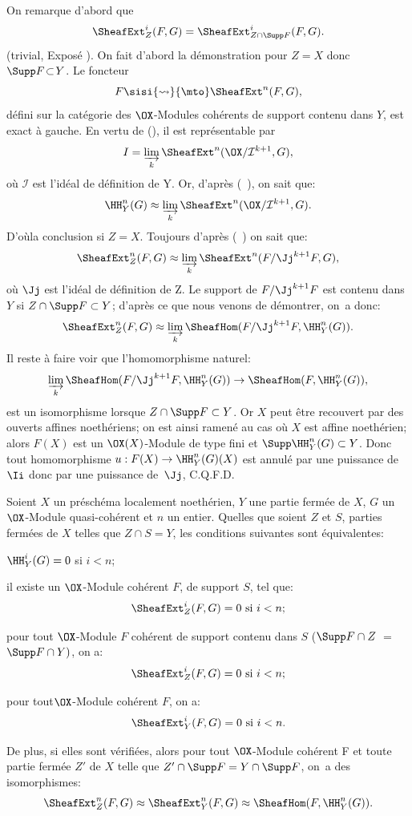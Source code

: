 On remarque d'abord que
\[
\SheafExt^i_Z(F, G) = \SheafExt^i_{Z \cap \Supp F}(F, G).
\]
(trivial, \cf Expos\'e ). On fait d'abord la d\'emonstration pour $Z \!=\! X$ donc \hbox{$\Supp F \!\subset\! Y$}. Le foncteur
\[F \sisi{\rightsquigarrow}{\mto} \SheafExt^n(F, G),
\]
d\'efini sur la cat\'egorie des $\OX$-Modules coh\'erents de support contenu dans $Y$, est exact \`a gauche. En vertu de (), il est repr\'esentable par
\[I = \varinjlim_{k} \SheafExt^n (\OX/\mathcal{I}^{k+1}, G),
\]
o\`u $\mathcal{I}$ est l'id\'eal de d\'efinition de Y. Or, d'apr\`es (~), on sait que:
\[
\HH^n_Y(G) \approx \varinjlim_{k} \SheafExt^n (\OX/\mathcal{I}^{k+1}, G).
\]
D'o\`u\pageoriginale la conclusion si $ Z= X$. Toujours d'apr\`es (~) on sait que:
\[
\SheafExt^n_Z (F, G) \approx \varinjlim_{k} \SheafExt^n (F/\Jj^{k + 1}F, G),
\]
o\`u $\Jj$ est l'id\'eal de d\'efinition de Z. Le support de $F/\Jj^{k+1}F$ est contenu dans $Y$ si $Z \cap \Supp F \subset Y$; d'apr\`es ce que nous venons de d\'emontrer, on~a donc:
\[
\SheafExt^n_Z (F, G) \approx \varinjlim_{k} \SheafHom (F/\Jj^{k + 1}F, \HH^n_Y(G)).
\]
Il reste \`a faire voir que l'homomorphisme naturel:
\[
\varinjlim_{k} \SheafHom (F/\Jj^{k + 1}F, \HH^n_Y(G)) \to \SheafHom (F, \HH^n_Y (G)),
\]
est un isomorphisme lorsque $Z \cap \Supp F \subset Y$. Or $X$ peut \^etre recouvert par des ouverts affines noeth\'eriens; on est ainsi ramen\'e au cas o\`u $X$ est affine noeth\'erien; alors $F(X)$ est un $\OX(X)$-Module de type fini et $\Supp \HH^n_Y(G) \subset Y$. Donc tout homomorphisme \hbox{$u: F(X) \to \HH^n_Y (G) (X)$} est annul\'e par une puissance de $\Ii$ donc par une puissance de~$\Jj$, \sisi{}{\hfill}C.Q.F.D.

\begin{proposition} \label{VII.1.2}
Soient $X$ un pr\'esch\'ema localement noeth\'erien, $Y$ une partie ferm\'ee de $X$, $G$ un $\OX$-Module quasi-coh\'erent et $n$ un entier. Quelles que soient $Z$ et $S$, parties ferm\'ees de $X$ telles que $Z \cap S = Y$, les conditions suivantes sont \'equivalentes:
\begin{enumeratei}
\item
$\HH^i_Y (G) = 0$ si $i<n$;

\item
il existe un $\OX$-Module coh\'erent $F$, de support $S$, tel que:
\[
\SheafExt^i_Z (F, G) = 0 \text{ si } i<n;\]

\item
pour tout $\OX$-Module $F$ coh\'erent de support contenu dans $S$ (\ie $\Supp F \cap Z$ $=$ $\Supp F \cap Y)$, on a:
\[
\SheafExt^i_{Z}(F, G) = 0 \text{ si } i < n;
\]
\item
pour tout\pageoriginale $\OX$-Module coh\'erent $F$, on a:
\[
\SheafExt^i_Y (F, G) = 0 \text{ si } i < n.
\]
\end{enumeratei}
\noindent
De plus, si elles sont v\'erifi\'ees, alors pour tout $\OX$-Module coh\'erent F et toute partie ferm\'ee $Z'$ de $X$ telle que $Z' \cap \Supp F = Y \cap \Supp F$, on~a des isomorphismes:
\[
\SheafExt^n_{Z} (F, G) \approx \SheafExt^n_Y (F, G) \approx \SheafHom (F, \HH^n_Y (G)).
\]
\end{proposition}

